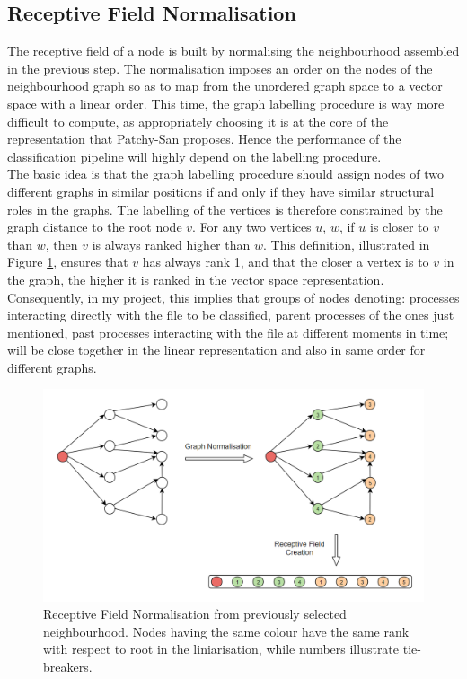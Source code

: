 \subsection{Receptive Field Normalisation}

The receptive field of a node is built by normalising the neighbourhood assembled in the previous step. The normalisation imposes an order on the nodes of the neighbourhood graph so as to map from the unordered graph space to a vector space with a linear order. This time, the graph labelling procedure is way more difficult to compute, as appropriately choosing it is at the core of the representation that Patchy-San proposes. Hence the performance of the classification pipeline will highly depend on the labelling procedure. \\

The basic idea is that the graph labelling procedure should assign nodes of two different graphs in similar positions if and only if they have similar structural roles in the graphs. The labelling of the vertices is therefore constrained by the graph distance to the root node $v$. For any two vertices $u$, $w$, if $u$ is closer to $v$ than $w$, then $v$ is
always ranked higher than $w$. This definition, illustrated in Figure \ref{normalisation}, ensures that $v$ has always rank 1, and that the closer a vertex is to $v$ in the graph, the higher it is ranked in the vector space representation. Consequently, in my project, this implies that groups of nodes denoting: processes interacting directly with the file to be classified, parent processes of the ones just mentioned, past processes interacting with the file at different moments in time; will be close together in the linear representation and also in same order for different graphs.\\

\begin{figure}[H]
  \centering
  \includegraphics[scale=0.55]{Images/normalisation.png}
  \caption{Receptive Field Normalisation from previously selected neighbourhood. Nodes having the same colour have the same rank with respect to root in the liniarisation, while numbers illustrate tie-breakers.}
  \label{normalisation}
\end{figure}

